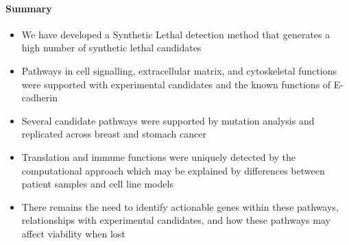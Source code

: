 \paragraph{Summary}

    
  \begin{itemize}
   \item We have developed a Synthetic Lethal detection method that generates a high number of \gls{synthetic lethal} candidates
   
   \bigskip
   
   \item Pathways in cell signalling, extracellular matrix, and cytoskeletal functions were supported with experimental candidates and the known functions of \gls{E-cadherin}
   
   \bigskip
   
   \item Several candidate pathways were supported by \gls{mutation} analysis and replicated across breast and stomach cancer
   
   \bigskip
   
   \item Translation and immune functions were uniquely detected by the computational approach which may be explained by differences between patient samples and cell line models
   
   \bigskip
   
   \item There remains the need to identify actionable genes within these pathways, relationships with experimental candidates, and how these pathways may affect viability when lost
  \end{itemize}
  \fi